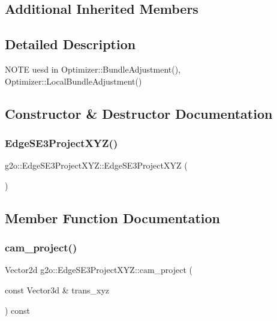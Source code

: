 \subsection*{Additional Inherited Members}


\subsection{Detailed Description}
N\+O\+TE uesd in Optimizer\+::\+Bundle\+Adjustment(), Optimizer\+::\+Local\+Bundle\+Adjustment() 

\subsection{Constructor \& Destructor Documentation}
\mbox{\label{classg2o_1_1_edge_s_e3_project_x_y_z_acdf6cb451767e46e7bbd6a180782feb8}} 
\subsubsection{\texorpdfstring{Edge\+S\+E3\+Project\+X\+Y\+Z()}{EdgeSE3ProjectXYZ()}}
{\footnotesize\ttfamily g2o\+::\+Edge\+S\+E3\+Project\+X\+Y\+Z\+::\+Edge\+S\+E3\+Project\+X\+YZ (\begin{DoxyParamCaption}{ }\end{DoxyParamCaption})}



\subsection{Member Function Documentation}
\mbox{\label{classg2o_1_1_edge_s_e3_project_x_y_z_ab6d57a3a8bbeafb3405ea39c98dca768}} 
\subsubsection{\texorpdfstring{cam\+\_\+project()}{cam\_project()}}
{\footnotesize\ttfamily Vector2d g2o\+::\+Edge\+S\+E3\+Project\+X\+Y\+Z\+::cam\+\_\+project (\begin{DoxyParamCaption}\item[{const Vector3d \&}]{trans\+\_\+xyz }\end{DoxyParamCaption}) const}

